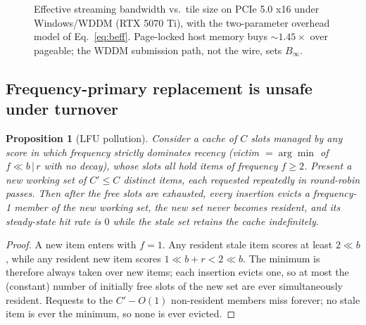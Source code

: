 \documentclass[11pt]{article}
\newtheorem{proposition}[theorem]{Proposition}
\theoremstyle{definition}
\theoremstyle{remark}
\begin{document}
\begin{figure}[t]
\centering
{}
\caption{Effective streaming bandwidth vs.\ tile size on PCIe 5.0 x16
under Windows/WDDM (RTX 5070 Ti), with the two-parameter overhead model of
Eq.~\eqref{eq:beff}. Page-locked host memory buys ${\sim}1.45\times$ over
pageable; the WDDM submission path, not the wire, sets $B_\infty$.}
\label{fig:tile}
\end{figure}

\subsection{Frequency-primary replacement is unsafe under turnover}
\label{sec:pollution}

\begin{proposition}[LFU pollution]\label{prop:pollution}
Consider a cache of $C$ slots managed by any score in which frequency
strictly dominates recency (victim $=\arg\min$ of $f\!\ll\!b \,|\, r$ with no
decay), whose slots all hold items of frequency $f\ge2$. Present a new
working set of $C' \le C$ distinct items, each requested repeatedly in
round-robin passes. Then after the free slots are exhausted, \emph{every}
insertion evicts a frequency-1 member of the new working set, the new set
never becomes resident, and its steady-state hit rate is $0$ while the stale
set retains the cache indefinitely.
\end{proposition}
\begin{proof}
A new item enters with $f{=}1$. Any resident stale item scores at least
$2\!\ll\!b$, while any resident new item scores $1\!\ll\!b + r <
2\!\ll\!b$. The minimum is therefore always taken over new items; each
insertion evicts one, so at most the (constant) number of initially free
slots of the new set are ever simultaneously resident. Requests to the
$C' - O(1)$ non-resident members miss forever; no stale item is ever the
minimum, so none is ever evicted.
\end{proof}
\end{document}

